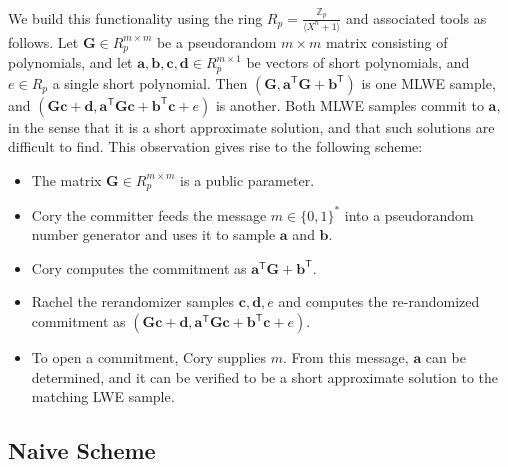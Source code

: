 We build this functionality using the ring $R_p = \frac{\mathbb{Z}_p}{\langle X^n + 1\rangle}$ and associated tools as follows. Let $\mathbf{G} \in R_p^{m \times m}$ be a pseudorandom $m \times m$ matrix consisting of polynomials, and let $\mathbf{a}, \mathbf{b}, \mathbf{c}, \mathbf{d} \in R_p^{m \times 1}$ be vectors of short polynomials, and $e \in R_p$ a single short polynomial. Then $(\mathbf{G}, \mathbf{a}^\mathsf{T} \mathbf{G} + \mathbf{b}^\mathsf{T})$ is one MLWE sample, and $(\mathbf{G}\mathbf{c} + \mathbf{d}, \mathbf{a}^\mathsf{T} \mathbf{G} \mathbf{c} + \mathbf{b}^\mathsf{T} \mathbf{c} + e)$ is another. Both MLWE samples commit to $\mathbf{a}$, in the sense that it is a short approximate solution, and that such solutions are difficult to find. This observation gives rise to the following scheme:
\begin{itemize}
\item The matrix $\mathbf{G} \in R_p^{m \times m}$ is a public parameter.
\item Cory the committer feeds the message $m \in \{0,1\}^*$ into a pseudorandom number generator and uses it to sample $\mathbf{a}$ and $\mathbf{b}$.
\item Cory computes the commitment as $\mathbf{a}^\mathsf{T} \mathbf{G} + \mathbf{b}^\mathsf{T}$.
\item Rachel the rerandomizer samples $\mathbf{c}, \mathbf{d}, e$ and computes the re-randomized commitment as $(\mathbf{G}\mathbf{c} + \mathbf{d}, \mathbf{a}^\mathsf{T} \mathbf{G} \mathbf{c} + \mathbf{b}^\mathsf{T} \mathbf{c} + e)$.
\item To open a commitment, Cory supplies $m$. From this message, $\mathbf{a}$ can be determined, and it can be verified to be a short approximate solution to the matching LWE sample.
\end{itemize}

\subsection{Naive Scheme}

